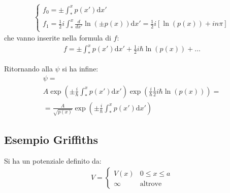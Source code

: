 \begin{equation}\begin{split}
\begin{cases}
f_0=\pm\int_*^x{p\left(x'\right)\textrm{d}x'}\\
f_1=\frac{1}{2}i\int_*^x{\frac{d}{dx'}\ln{\left(\pm p\left(x\right)\right)}\textrm{d}x'}=\frac{1}{2}i\left[\ln{\left( p\left(x\right)\right)}+in\pi\right]
\end{cases}
\end{split}\end{equation}
che vanno inserite nella formula di $f$:
\begin{equation}\begin{split}
f=\pm\int_*^x{p\left(x'\right)\textrm{d}x'}+\frac{1}{2}i\hbar \ln{\left(p\left(x\right)\right)}+\dots
\end{split}\end{equation}

Ritornando alla $\psi $ si ha infine:
\begin{equation}\begin{split}
\psi =\\
A\exp{\left(\pm\frac{i}{\hbar }\int_*^x{p\left(x'\right)\textrm{d}x'}\right)}\exp{\left(\frac{i}{\hbar }\frac{1}{2}i\hbar \ln{\left(p\left(x\right)\right)}\right)}=\\
=\frac{A}{\sqrt{p\left(x\right)}}\exp{\left(\pm\frac{i}{\hbar }\int_*^x{p\left(x'\right)\textrm{d}x'}\right)}
\end{split}\end{equation}

\subsection{Esempio Griffiths} %
Si ha un potenziale definito da:
\begin{equation}\begin{split}
V=\begin{cases}
V\left(x\right) & 0\le x \le a\\
\infty & \textrm{altrove}
\end{cases}
\end{split}\end{equation}

